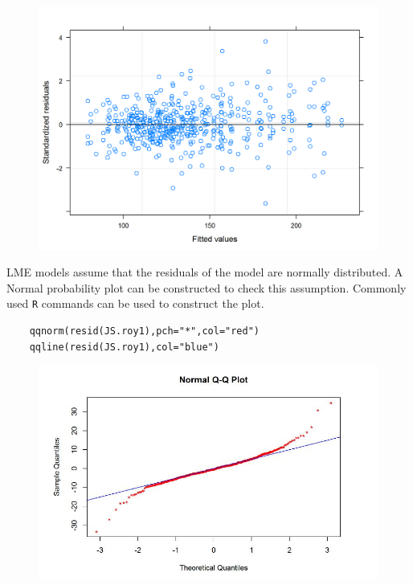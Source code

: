 \documentclass[Main.tex]{subfiles}
\begin{document}
\begin{figure}[h!]
	\centering
	\includegraphics[width=0.9\linewidth]{images/ResidPlot1}
	\caption{}
	\label{fig:ResidPlot1}
\end{figure}
LME models assume that the residuals of the model are normally distributed. A Normal probability plot can be constructed to check this assumption. Commonly used \texttt{R} commands can be used to construct the plot.
\newpage

\begin{framed}
	\begin{verbatim}
	qqnorm(resid(JS.roy1),pch="*",col="red")
	qqline(resid(JS.roy1),col="blue")
	\end{verbatim}
\end{framed}




\begin{figure}[h!]
	\centering
	\includegraphics[width=0.7\linewidth]{images/Resid-newplot}
	\caption{}
	\label{fig:Resid-newplot}
\end{figure}
\end{document}

